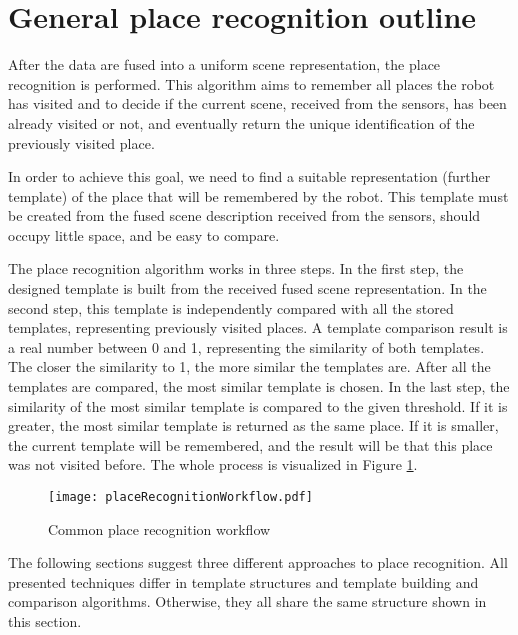 \section{General place recognition outline}\label{section:placeOutline}

After the data are fused into a uniform scene representation, the place recognition is performed. This algorithm aims to remember all places the robot has visited and to decide if the current scene, received from the sensors, has been already visited or not, and eventually return the unique identification of the previously visited place.\par
In order to achieve this goal, we need to find a suitable representation (further template) of the place that will be remembered by the robot. This template must be created from the fused scene description received from the sensors, should occupy little space, and be easy to compare.\par
The place recognition algorithm works in three steps. In the first step, the designed template is built from the received fused scene representation. In the second step, this template is independently compared with all the stored templates, representing previously visited places. A template comparison result is a real number between 0 and 1, representing the similarity of both templates. The closer the similarity to 1, the more similar the templates are. After all the templates are compared, the most similar template is chosen. In the last step, the similarity of the most similar template is compared to the given threshold. If it is greater, the most similar template is returned as the same place. If it is smaller, the current template will be remembered, and the result will be that this place was not visited before. The whole process is visualized in Figure \ref{fig:placeRecognitionWorkflow}.\par

\begin{figure}[htpb]
    \centering
    \texttt{[image: placeRecognitionWorkflow.pdf]}
    \caption{Common place recognition workflow} \label{fig:placeRecognitionWorkflow}
\end{figure}

The following sections suggest three different approaches to place recognition. All presented techniques differ in template structures and template building and comparison algorithms. Otherwise, they all share the same structure shown in this section.